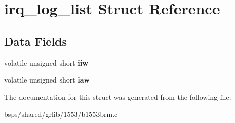 \hypertarget{structirq__log__list}{}\section{irq\+\_\+log\+\_\+list Struct Reference}
\label{structirq__log__list}
\subsection*{Data Fields}
\begin{DoxyCompactItemize}
\item 
\mbox{\label{structirq__log__list_a3cddf2769bdb00472bbfa6946153659a}} 
volatile unsigned short {\bfseries iiw}
\item 
\mbox{\label{structirq__log__list_a98be370a16bda3c2094d90173556bfc4}} 
volatile unsigned short {\bfseries iaw}
\end{DoxyCompactItemize}


The documentation for this struct was generated from the following file\+:\begin{DoxyCompactItemize}
\item 
bsps/shared/grlib/1553/b1553brm.\+c\end{DoxyCompactItemize}
